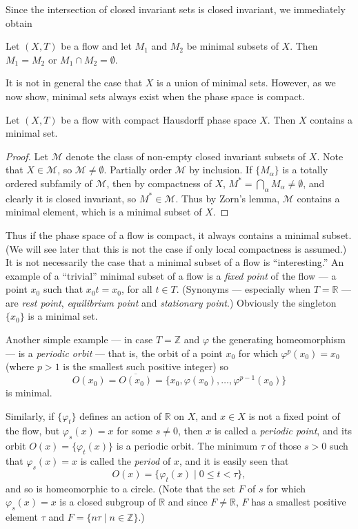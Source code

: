 Since the intersection of closed invariant sets is closed invariant, we immediately obtain

\begin{proposition}[3]
    Let $(X,T)$ be a flow and let $M_1$ and $M_2$ be minimal subsets of $X$. Then $M_1 = M_2$ or $M_1 \cap M_2 = \emptyset$.
\end{proposition}

It is not in general the case that $X$ is a union of minimal sets. However, as we now show, minimal sets always exist when the phase space is compact.

\begin{theorem*}[4]
    Let $(X,T)$ be a flow with compact Hausdorff phase space $X$. Then $X$ contains a minimal set.
\end{theorem*}

\begin{proof}
    Let $\mathcal{M}$ denote the class of non-empty closed invariant subsets of $X$. Note that $X \in \mathcal{M}$, so $\mathcal{M} \ne \emptyset$. Partially order $\mathcal{M}$ by inclusion. If $\{M_\alpha\}$ is a totally ordered subfamily of $\mathcal{M}$, then by compactness of $X$, $M^* = \bigcap_\alpha M_\alpha \ne \emptyset$, and clearly it is closed invariant, so $M^* \in \mathcal{M}$. Thus by Zorn’s lemma, $\mathcal{M}$ contains a minimal element, which is a minimal subset of $X$.
\end{proof}

Thus if the phase space of a flow is compact, it always contains a minimal subset. (We will see later that this is not the case if only local compactness is assumed.) It is not necessarily the case that a minimal subset of a flow is “interesting.” An example of a “trivial” minimal subset of a flow is a \emph{fixed point} of the flow — a point $x_0$ such that $x_0 t = x_0$, for all $t \in T$. (Synonyms — especially when $T = \mathbb{R}$ — are \emph{rest point}, \emph{equilibrium point} and \emph{stationary point}.) Obviously the singleton $\{x_0\}$ is a minimal set.

Another simple example — in case $T = \mathbb{Z}$ and $\varphi$ the generating homeomorphism — is a \emph{periodic orbit} — that is, the orbit of a point $x_0$ for which $\varphi^p(x_0) = x_0$ (where $p > 1$ is the smallest such positive integer) so
\[
    O(x_0) = \overline{O(x_0)} = \{x_0, \varphi(x_0), \ldots, \varphi^{p-1}(x_0)\}
\]
is minimal.

Similarly, if $\{\varphi_t\}$ defines an action of $\mathbb{R}$ on $X$, and $x \in X$ is not a fixed point of the flow, but $\varphi_s(x) = x$ for some $s \neq 0$, then $x$ is called a \emph{periodic point}, and its orbit $O(x) = \{\varphi_t(x)\}$ is a periodic orbit. The minimum $\tau$ of those $s > 0$ such that $\varphi_s(x) = x$ is called the \emph{period} of $x$, and it is easily seen that
\[
    O(x) = \{\varphi_t(x) \mid 0 \le t < \tau\},
\]
and so is homeomorphic to a circle. (Note that the set $F$ of $s$ for which $\varphi_s(x) = x$ is a closed subgroup of $\mathbb{R}$ and since $F \ne \mathbb{R}$, $F$ has a smallest positive element $\tau$ and $F = \{n\tau \mid n \in \mathbb{Z}\}$.)

